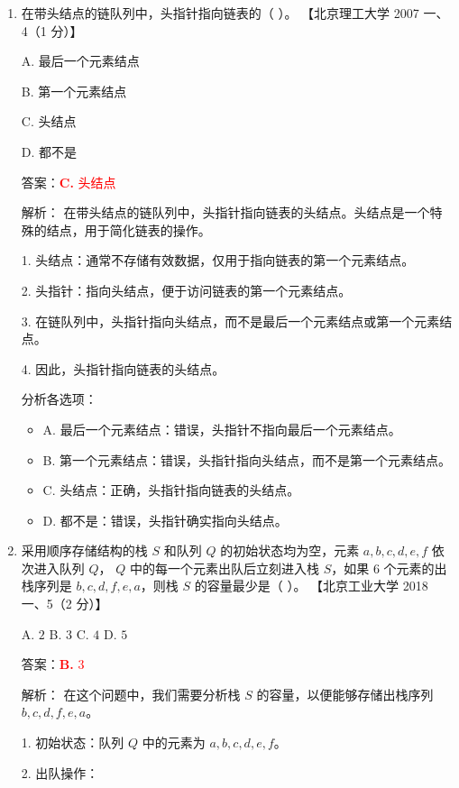 \documentclass[lang=cn,newtx,10pt,scheme=chinese]{../../../elegantbook}
\begin{document}
\begin{enumerate}
    \item 在带头结点的链队列中，头指针指向链表的（ ）。  
    【北京理工大学 2007 一、4（1 分）】  

    A. 最后一个元素结点  

    B. 第一个元素结点  

    C. 头结点  

    D. 都不是  

    答案：\textcolor{red}{\textbf{C.} 头结点}

    解析：
    在带头结点的链队列中，头指针指向链表的头结点。头结点是一个特殊的结点，用于简化链表的操作。

    1. 头结点：通常不存储有效数据，仅用于指向链表的第一个元素结点。

    2. 头指针：指向头结点，便于访问链表的第一个元素结点。

    3. 在链队列中，头指针指向头结点，而不是最后一个元素结点或第一个元素结点。

    4. 因此，头指针指向链表的头结点。

    分析各选项：
    \begin{itemize}
        \item A. 最后一个元素结点：错误，头指针不指向最后一个元素结点。
        
        \item B. 第一个元素结点：错误，头指针指向头结点，而不是第一个元素结点。
        
        \item C. 头结点：正确，头指针指向链表的头结点。
        
        \item D. 都不是：错误，头指针确实指向头结点。   
        \end{itemize}

    \item 采用顺序存储结构的栈 $S$ 和队列 $Q$ 的初始状态均为空，元素 $a, b, c, d, e, f$ 依次进入队列 $Q$，
    $Q$ 中的每一个元素出队后立刻进入栈 $S$，如果 6 个元素的出栈序列是 $b,c,d,f,e,a$，则栈 $S$ 的容量最少是（ ）。  
    【北京工业大学 2018 一、5（2 分）】  

    A. $2$ \quad B. $3$ \quad C. $4$ \quad D. $5$  

    答案：\textcolor{red}{\textbf{B.} $3$}

    解析：
    在这个问题中，我们需要分析栈 $S$ 的容量，以便能够存储出栈序列 $b,c,d,f,e,a$。

    1. 初始状态：队列 $Q$ 中的元素为 $a, b, c, d, e, f$。

    2. 出队操作：


\end{enumerate}
\end{document}
